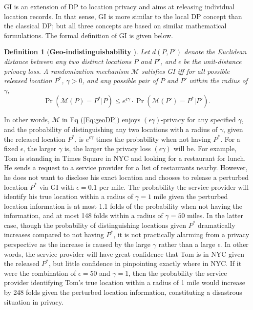 \documentclass[10pt,journal,compsoc]{IEEEtran}
\newtheorem{defn}{Definition}
\newcommand{\M}{\mathcal{M}}
\begin{document}
GI is an extension of DP to location privacy and aims at releasing individual location records. In that sense, GI is more similar to the local DP concept than the classical DP; but all three concepts are based on similar mathematical formulations.  The formal definition of GI is given below.
\begin{defn}[\textbf{Geo-indistinguishability} \cite{andres2013geo}]\label{def:GI}
Let $d(P,P')$  denote the Euclidean distance between any two distinct locations $P$ and $P'$, and $\epsilon$ be the unit-distance privacy loss. A randomization mechanism $\M$ satisfies GI iff for all possible released location $P^*$, $\gamma>0$, and any possible pair of $P$ and $P'$ within the radius of $\gamma$, 
\begin{equation}\label{Eq:geoDP}
\Pr(\M(P)=P^*|P)\le e^{\epsilon\gamma}\cdot\Pr(\M(P')=P^*|P').
\end{equation}
\end{defn}\vspace{-3pt}
In other words, $\M$ in Eq (\ref{Eq:geoDP}) enjoys $(\epsilon\gamma)$-privacy for any specified $\gamma$, and  the probability of distinguishing any two locations with a radius of $\gamma$, given the released location $P^*$, is $e^{\epsilon\gamma}$ times the probability  when  not  having $P^*$. For a fixed $\epsilon$, the larger $\gamma$ is, the larger the privacy loss $(\epsilon\gamma)$ will be.  For example, Tom is standing in Times Square in NYC and looking for a restaurant for lunch. He sends a request to a service provider for a list of restaurants nearby. However, he does not want to disclose his exact location and chooses to release a perturbed location $P^*$ via GI with $\epsilon=0.1$ per mile. The probability the service provider will identify his true location within a radius of $\gamma=1$ mile given the perturbed location information is at most 1.1 folds of the probability when  not having the information, and at most 148 folds within a radius of $\gamma=50$ miles. In the latter case, though the probability of distinguishing locations given $P^*$ dramatically increases compared to not having $P^*$, it is not practically alarming from a privacy perspective as the increase is caused by the large $\gamma$ rather than a large $\epsilon$. In other words, the service provider will have great confidence that Tom is in NYC given the released $P^*$, but little confidence in pinpointing exactly where in NYC. If it were the combination of $\epsilon=50$ and $\gamma=1$, then the probability the service provider identifying Tom's true location within a radius of 1 mile would increase by 248 folds  given the perturbed location information, constituting a disastrous situation in privacy.
\end{document}
